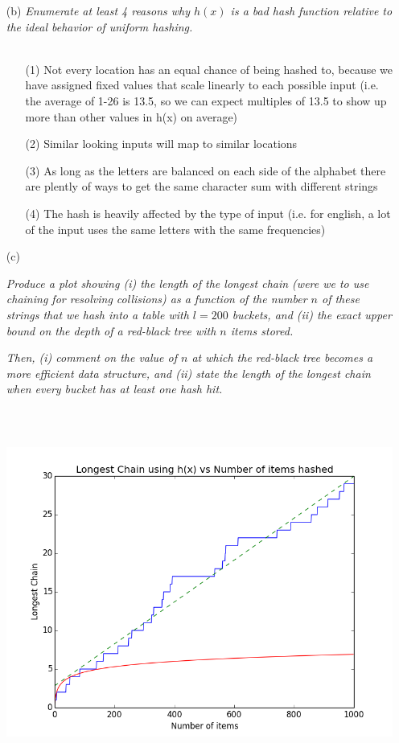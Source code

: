 \documentclass[12pt]{article} \setlength{\oddsidemargin}{0in}
\begin{document}
{\begin{enumerate}
\item[(b)]{\textit{Enumerate at least 4 reasons why $h(x)$ is a bad hash function relative to the ideal behavior of uniform hashing.}}
  \\\\
  \begin{itemize}
    \item[(1)] Not every location has an equal chance of being hashed to, because we have assigned fixed values that scale linearly to each possible input (i.e. the average of 1-26 is 13.5, so we can expect multiples of 13.5 to show up more than other values in h(x) on average)
    \item[(2)] Similar looking inputs will map to similar locations
    \item[(3)] As long as the letters are balanced on each side of the alphabet there are plently of ways to get the same character sum with different strings
    \item[(4)] The hash is heavily affected by the type of input (i.e. for english, a lot of the input uses the same letters with the same frequencies)
  \end{itemize}

\pagebreak
  
\item[(c)]{\textit{Produce a plot showing (i) the length of the longest chain (were we to use chaining for resolving collisions) as a function of the number $n$ of these strings that we hash
into a table with $l = 200$ buckets, and (ii) the exact upper bound on the depth
of a red-black tree with $n$ items stored.}

\textit{Then, (i) comment on the value of $n$ at which the red-black tree becomes a more
efficient data structure, and (ii) state the length of the longest chain when every
bucket has at least one hash hit.}}
  \\\\
  \includegraphics[width=15cm,height=10cm]{figure_2}


\end{enumerate}}
\end{document}

